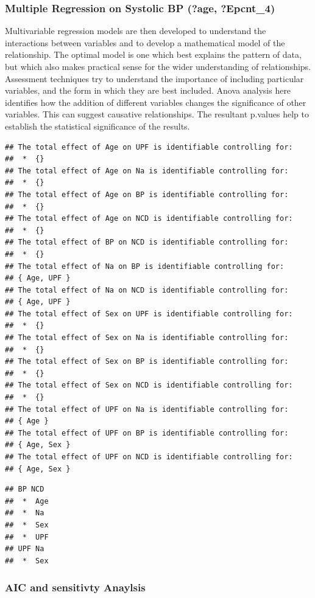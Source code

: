 \documentclass[
]{article}
\begin{document}
\hypertarget{multiple-regression-on-systolic-bp-age-epcnt_4}{%
\subsubsection{Multiple Regression on Systolic BP (?age,
?Epcnt\_4)}\label{multiple-regression-on-systolic-bp-age-epcnt_4}}

Multivariable regression models are then developed to understand the
interactions between variables and to develop a mathematical model of
the relationship. The optimal model is one which best explains the
pattern of data, but which also makes practical sense for the wider
understanding of relationships. Assessment techniques try to understand
the importance of including particular variables, and the form in which
they are best included. Anova analysis here identifies how the addition
of different variables changes the significance of other variables. This
can suggest causative relationships. The resultant p.values help to
establish the statistical significance of the results.

\begin{verbatim}
## The total effect of Age on UPF is identifiable controlling for:
##  *  {}
## The total effect of Age on Na is identifiable controlling for:
##  *  {}
## The total effect of Age on BP is identifiable controlling for:
##  *  {}
## The total effect of Age on NCD is identifiable controlling for:
##  *  {}
## The total effect of BP on NCD is identifiable controlling for:
##  *  {}
## The total effect of Na on BP is identifiable controlling for:
## { Age, UPF }
## The total effect of Na on NCD is identifiable controlling for:
## { Age, UPF }
## The total effect of Sex on UPF is identifiable controlling for:
##  *  {}
## The total effect of Sex on Na is identifiable controlling for:
##  *  {}
## The total effect of Sex on BP is identifiable controlling for:
##  *  {}
## The total effect of Sex on NCD is identifiable controlling for:
##  *  {}
## The total effect of UPF on Na is identifiable controlling for:
## { Age }
## The total effect of UPF on BP is identifiable controlling for:
## { Age, Sex }
## The total effect of UPF on NCD is identifiable controlling for:
## { Age, Sex }
\end{verbatim}

\begin{verbatim}
## BP NCD 
##  *  Age
##  *  Na
##  *  Sex
##  *  UPF
## UPF Na 
##  *  Sex
\end{verbatim}

\hypertarget{aic-and-sensitivty-anaylsis}{%
\subsubsection{AIC and sensitivty
Anaylsis}\label{aic-and-sensitivty-anaylsis}}
\end{document}
